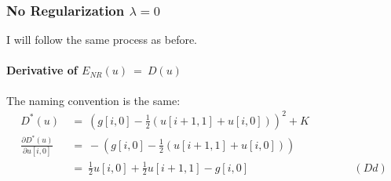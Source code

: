 \documentclass{report}
\begin{document}
			\subsubsection{No Regularization $\lambda = 0$}
			\startsubsection
				I will follow the same process as before.
				\vspace{-0.4cm} \paragraph{Derivative of  $E_{NR}(u) \ = \ D(u)$}
				\startsubsection
					The naming convention is the same:
					\vspace{-0.2cm}
					\begin{align*}
						D^*(u) \ & = \ (g[i,0] - \frac{1}{2} (u[i+1,1] + u[i,0]))^2 + K \\
						\frac{\partial D^*(u)}{\partial u[i,0]} \ & = \ - (g[i,0] - \frac{1}{2} (u[i+1,1] + u[i,0])) \\
						& = \ \frac{1}{2} u[i,0]  + \frac{1}{2} u[i+1,1] - g[i,0] \hspace{4cm} (Dd)
					\end{align*}
				\closesection
			\closesection
\end{document}

